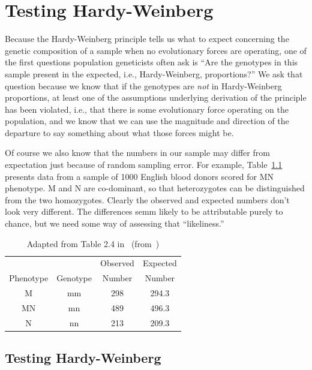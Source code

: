 \chapter{Testing Hardy-Weinberg}

Because the Hardy-Weinberg principle tells us what to expect
concerning the genetic composition of a sample when no evolutionary
forces are operating, one of the first questions population
geneticists often ask is ``Are the genotypes in this sample present in
the expected, i.e., Hardy-Weinberg, proportions?'' We ask that
question because we know that if the genotypes are {\it not\/} in
Hardy-Weinberg proportions, at least one of the assumptions underlying
derivation of the principle has been violated, i.e., that there is
some evolutionary force operating on the population, and we know that
we can use the magnitude and direction of the departure to say
something about what those forces might be.

Of course we also know that the numbers in our sample may differ from
expectation just because of random sampling error. For example,
Table~\ref{table:MN-data} presents data from a sample of 1000 English
blood donors scored for MN phenotype. M and N are co-dominant, so that
heterozygotes can be distinguished from the two homozygotes. Clearly
the observed and expected numbers don't look very different. The
differences semm likely to be attributable purely to chance, but we
need some way of assessing that ``likeliness.''

\begin{table}
\begin{center}
\begin{tabular}{cccc}
\hline\hline
          &          & Observed & Expected \\
Phenotype & Genotype & Number   & Number   \\
\hline
M         & mm       & 298      & 294.3 \\
MN        & mn       & 489      & 496.3 \\
N         & nn       & 213      & 209.3 \\
\hline
\end{tabular}
\end{center}
\caption{Adapted from Table 2.4 in~\cite{Hedrick-2000}
  (from~\cite{Cleghorn-1960})}\label{table:MN-data} 
\end{table}

\section*{Testing Hardy-Weinberg}

